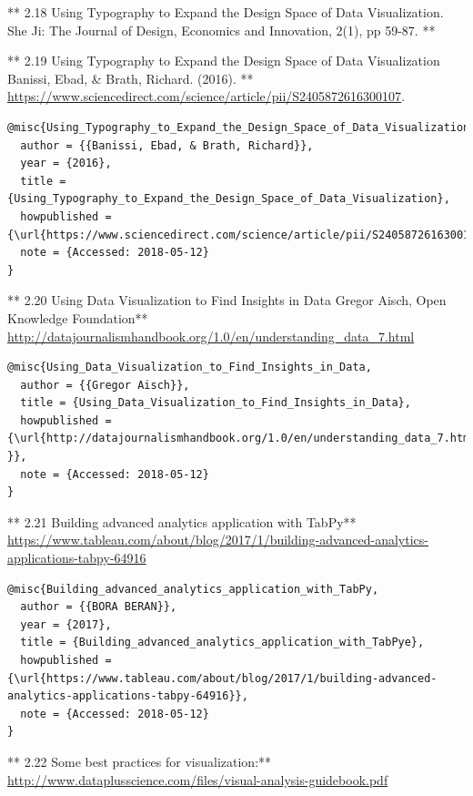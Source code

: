\documentclass[]{book}
\theoremstyle{definition}
\theoremstyle{definition}
\theoremstyle{definition}
\theoremstyle{remark}
\begin{document}
** 2.18 Using Typography to Expand the Design Space of Data
Visualization. She Ji: The Journal of Design, Economics and Innovation,
2(1), pp 59-87. **

** 2.19 Using Typography to Expand the Design Space of Data
Visualization\textbf{ }Banissi, Ebad, \& Brath, Richard. (2016). **
\url{https://www.sciencedirect.com/science/article/pii/S2405872616300107}.
\citep{Using_Typography_to_Expand_the_Design_Space_of_Data_Visualization}

\begin{verbatim}
@misc{Using_Typography_to_Expand_the_Design_Space_of_Data_Visualization,
  author = {{Banissi, Ebad, & Brath, Richard}},
  year = {2016},
  title = {Using_Typography_to_Expand_the_Design_Space_of_Data_Visualization},
  howpublished = {\url{https://www.sciencedirect.com/science/article/pii/S2405872616300107}},
  note = {Accessed: 2018-05-12}
}
\end{verbatim}

** 2.20 Using Data Visualization to Find Insights in Data\textbf{
}Gregor Aisch, Open Knowledge Foundation**
\url{http://datajournalismhandbook.org/1.0/en/understanding_data_7.html}
\citep{Using_Data_Visualization_to_Find_Insights_in_Data}

\begin{verbatim}
@misc{Using_Data_Visualization_to_Find_Insights_in_Data,
  author = {{Gregor Aisch}},
  title = {Using_Data_Visualization_to_Find_Insights_in_Data},
  howpublished = {\url{http://datajournalismhandbook.org/1.0/en/understanding_data_7.html }},
  note = {Accessed: 2018-05-12}
}
\end{verbatim}

** 2.21 Building advanced analytics application with TabPy**
\url{https://www.tableau.com/about/blog/2017/1/building-advanced-analytics-applications-tabpy-64916}
\citep{Building_advanced_analytics_application_with_TabPy}

\begin{verbatim}
@misc{Building_advanced_analytics_application_with_TabPy,
  author = {{BORA BERAN}},
  year = {2017},
  title = {Building_advanced_analytics_application_with_TabPye},
  howpublished = {\url{https://www.tableau.com/about/blog/2017/1/building-advanced-analytics-applications-tabpy-64916}},
  note = {Accessed: 2018-05-12}
}
\end{verbatim}

** 2.22 Some best practices for visualization:**
\url{http://www.dataplusscience.com/files/visual-analysis-guidebook.pdf}
\citep{Visual_Analysis_Best_Practices}
\end{document}
